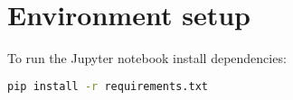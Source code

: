 \appendix


\label{Setup}
\section*{Environment setup}

To run the Jupyter notebook install dependencies:

\begin{lstlisting}[language=bash]
pip install -r requirements.txt
\end{lstlisting}




\newpage
{}\label{SomePdf}
